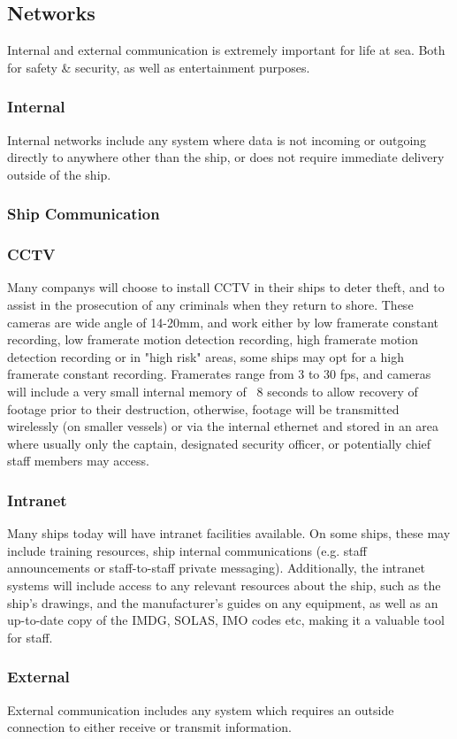 \documentclass[11pt,a4paper]{article}
\begin{document}
\subsection{Networks}
Internal and external communication is extremely important for life at sea. Both for safety \& security, as well as entertainment purposes.
\subsubsection{Internal}
Internal networks include any system where data is not incoming or outgoing directly to anywhere other than the ship, or does not require immediate delivery outside of the ship.
\subsubsection{Ship Communication}
\subsubsection{CCTV}
 Many companys will choose to install CCTV in their ships to deter theft, and to assist in the prosecution of any criminals when they return to shore. These cameras are wide angle of 14-20mm, and work either by low framerate constant recording, low framerate motion detection recording, high framerate motion detection recording or in "high risk" areas, some ships may opt for a high framerate constant recording. Framerates range from 3 to 30 fps, and cameras will include a very small internal memory of ~8 seconds to allow recovery of footage prior to their destruction, otherwise, footage will be transmitted wirelessly (on smaller vessels) or via the internal ethernet and stored in an area where usually only the captain, designated security officer, or potentially chief staff members may access.
\subsubsection{Intranet}
Many ships today will have intranet facilities available. On some ships, these may include training resources, ship internal communications (e.g. staff announcements or staff-to-staff private messaging). Additionally, the intranet systems will include access to any relevant resources about the ship, such as the ship's drawings, and the manufacturer's guides on any equipment, as well as an up-to-date copy of the IMDG, SOLAS, IMO codes etc, making it a valuable tool for staff.
\subsubsection{External}
External communication includes any system which requires an outside connection to either receive or transmit information.
\end{document}
